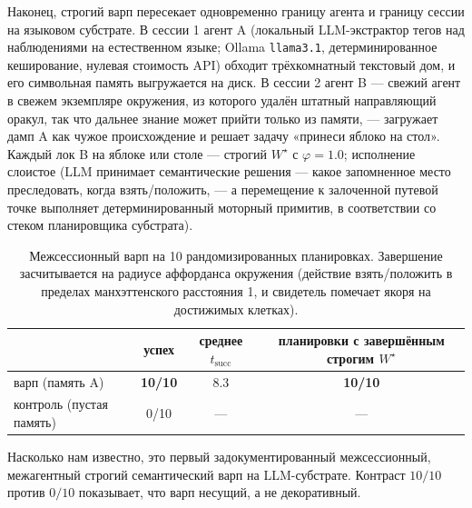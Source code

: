 \documentclass{article}
\newcommand{\method}[1]{\texttt{#1}}
\newcommand{\wstar}{W^{\star}}
\begin{document}
Наконец, строгий варп пересекает одновременно границу агента и
границу сессии на языковом субстрате. В сессии 1 агент A (локальный
LLM-экстрактор тегов над наблюдениями на естественном языке; Ollama
\method{llama3.1}, детерминированное кеширование, нулевая стоимость
API) обходит трёхкомнатный текстовый дом, и его символьная память
выгружается на диск. В сессии 2 агент B --- свежий агент в свежем
экземпляре окружения, из которого удалён штатный направляющий оракул,
так что дальнее знание может прийти только из памяти, --- загружает
дамп A как чужое происхождение и решает задачу «принеси яблоко на
стол». Каждый лок B на яблоке или столе --- строгий $\wstar$ с
$\varphi{=}1.0$; исполнение слоистое (LLM принимает семантические
решения --- какое запомненное место преследовать, когда взять/положить,
--- а перемещение к залоченной путевой точке выполняет
детерминированный моторный примитив, в соответствии со стеком
планировщика субстрата).

\begin{table}[h]
\centering
\caption{Межсессионный варп на 10 рандомизированных планировках.
Завершение засчитывается на радиусе аффорданса окружения (действие
взять/положить в пределах манхэттенского расстояния 1, и свидетель
помечает якоря на достижимых клетках).}
\label{tab:llm}
\small
\begin{tabular}{lccc}
\toprule
 & успех & среднее $t_{\text{succ}}$ & планировки с завершённым строгим $\wstar$ \\
\midrule
варп (память A) & \textbf{10/10} & 8.3 & \textbf{10/10} \\
контроль (пустая память) & 0/10 & --- & --- \\
\bottomrule
\end{tabular}
\end{table}

Насколько нам известно, это первый задокументированный межсессионный,
межагентный строгий семантический варп на LLM-субстрате. Контраст
$10/10$ против $0/10$ показывает, что варп несущий, а не
декоративный.
\end{document}

